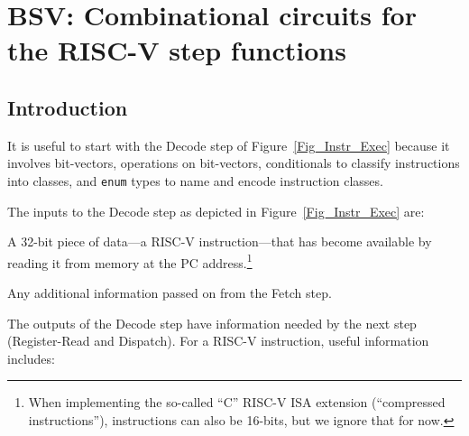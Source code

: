 

\chapter{BSV: Combinational circuits for the RISC-V step functions}


\setcounter{page}{1}
\renewcommand{\thepage}{\arabic{chapter}-\arabic{page}}

\label{ch_Combo_Circuits}


\section{Introduction}

It is useful to start with the Decode step of
Figure~\ref{Fig_Instr_Exec} because it involves bit-vectors,
operations on bit-vectors, conditionals to classify instructions into
classes, and \verb|enum| types to name and encode instruction classes.

The inputs to the Decode step as depicted in
Figure~\ref{Fig_Instr_Exec} are:

\begin{tightlist}

 \item A 32-bit piece of data---a RISC-V instruction---that has become
 available by reading it from memory at the PC address.\footnote{When
 implementing the so-called ``C'' RISC-V ISA extension (``compressed
 instructions''), instructions can also be 16-bits, but we
 ignore that for now.}

 \item Any additional information passed on from the Fetch step.

\end{tightlist}

The outputs of the Decode step have information needed by the next
step (Register-Read and Dispatch).  For a RISC-V instruction, useful
information includes:

